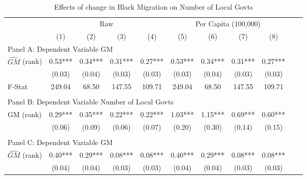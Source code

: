  \begin{table}[htbp]\centering {} \begin{threeparttable} \caption{Effects of change in Black Migration on Number of Local Govts} \begin{tabular}{l*{10}{c}} \toprule
                &\multicolumn{4}{c}{Raw}                                    &\multicolumn{4}{c}{Per Capita (100,000)}                   \\\cmidrule(lr){2-5}\cmidrule(lr){6-9}
                &\multicolumn{1}{c}{(1)}   &\multicolumn{1}{c}{(2)}   &\multicolumn{1}{c}{(3)}   &\multicolumn{1}{c}{(4)}   &\multicolumn{1}{c}{(5)}   &\multicolumn{1}{c}{(6)}   &\multicolumn{1}{c}{(7)}   &\multicolumn{1}{c}{(8)}   \\
\cmidrule(lr){1-9}
\multicolumn{8}{l}{Panel A: Dependent Variable GM}\\
\cmidrule(lr){1-9}
$\hat{GM}$ (rank)&       0.53***&       0.34***&       0.31***&       0.27***&       0.53***&       0.34***&       0.31***&       0.27***\\
                &     (0.03)   &     (0.04)   &     (0.03)   &     (0.03)   &     (0.03)   &     (0.04)   &     (0.03)   &     (0.03)   \\
\midrule
F-Stat          &     249.04   &      68.50   &     147.55   &     109.71   &     249.04   &      68.50   &     147.55   &     109.71   \\
\cmidrule[\heavyrulewidth](lr){1-9} \\ \cmidrule[\heavyrulewidth](lr){1-9}
\multicolumn{8}{l}{Panel B: Dependent Variable Number of Local Govts}\\
\cmidrule(lr){1-9}
GM  (rank)      &       0.29***&       0.35***&       0.22***&       0.22***&       1.03***&       1.15***&       0.69***&       0.60***\\
                &     (0.06)   &     (0.09)   &     (0.06)   &     (0.07)   &     (0.20)   &     (0.30)   &     (0.14)   &     (0.15)   \\
\cmidrule[\heavyrulewidth](lr){1-9} \\ \cmidrule[\heavyrulewidth](lr){1-9}
\multicolumn{8}{l}{Panel C: Dependent Variable GM}\\
\cmidrule(lr){1-9}
$\hat{GM}$ (rank)&       0.40***&       0.29***&       0.08***&       0.08***&       0.40***&       0.29***&       0.08***&       0.08***\\
                &     (0.04)   &     (0.04)   &     (0.03)   &     (0.03)   &     (0.04)   &     (0.04)   &     (0.03)   &     (0.03)   \\

\end{tabular}
\end{threeparttable}
\end{table}
